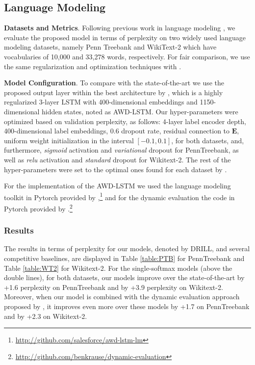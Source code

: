 \documentclass{article}
\begin{document}
\subsection{Language Modeling}
\label{sec:lm}

\textbf{Datasets and Metrics}. Following previous work in language modeling  \cite{mos2018,krause2017dynamic,merity2017regularizing,melis2017state}, we evaluate the proposed model in terms of  perplexity on two widely used language modeling datasets, namely Penn Treebank \cite{mikolov2010} and WikiText-2  \cite{merity2017regularizing} which have vocabularies of 10,000 and 33,278 words, respectively.  For fair comparison, we use the same regularization and optimization techniques with  \citet{merity2017regularizing}. 

\textbf{Model Configuration}.
To compare with the state-of-the-art we use the proposed output layer within the best architecture by \citet{merity2017regularizing}, which is a highly regularized 3-layer LSTM with 400-dimensional embeddings and 1150-dimensional hidden states, noted as AWD-LSTM. Our hyper-parameters were optimized based on validation perplexity, as follows:  4-layer label encoder depth, 400-dimensional label embeddings,  0.6 dropout rate,  residual connection to $\mathbf{E}$, uniform weight initialization in the interval $[-0.1, 0.1]$, for both datasets, and, furthermore, \textit{sigmoid} activation and \textit{variational} dropout for PennTreebank, as well as \textit{relu} activation and \textit{standard} dropout for Wikitext-2. The rest of the hyper-parameters were set to the optimal ones found for each dataset by \citet{merity2017regularizing}. 

For the implementation of the AWD-LSTM we used the language modeling toolkit in  Pytorch provided by \citet{merity2017regularizing},\footnote{\url{http://github.com/salesforce/awd-lstm-lm}} and for the dynamic evaluation the code in Pytorch provided by \citet{krause2017dynamic}.\footnote{\url{http://github.com/benkrause/dynamic-evaluation}} 

\subsubsection{Results}
\label{lm_results}

The results in terms of perplexity for our models, denoted by DRILL, and several competitive baselines, are displayed in Table \ref{table:PTB} for PennTreebank and Table \ref{table:WT2} for Wikitext-2.
For the single-softmax models (above the double lines), for both datasets, our models improve over the state-of-the-art by +1.6 perplexity on PennTreebank and by +3.9 perplexity on Wikitext-2. Moreover, when our model is combined with the dynamic evaluation approach proposed by \citet{krause2017dynamic}, it improves even more over these models by +1.7 on PennTreebank and by +2.3 on Wikitext-2.
\end{document}
